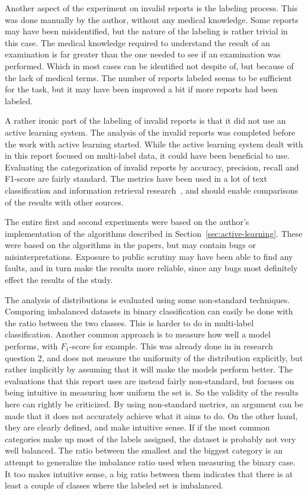 Another aspect of the experiment on invalid reports is the labeling process.
This was done manually by the author, without any medical knowledge.
Some reports may have been misidentified, but the nature of the labeling is rather trivial in this case.
The medical knowledge required to understand the result of an examination is far greater than the one needed to see if an examination was performed.
Which in most cases can be identified not despite of, but because of the lack of medical terms.
The number of reports labeled seems to be sufficient for the task, but it may have been improved a bit if more reports had been labeled.

A rather ironic part of the labeling of invalid reports is that it did not use an active learning system.
The analysis of the invalid reports was completed before the work with active learning started.
While the active learning system dealt with in this report focused on multi-label data, it could have been beneficial to use.
Evaluating the categorization of invalid reports by accuracy, precision, recall and F1-score are fairly standard.
The metrics have been used in a lot of text classification and information retrieval research~\cite{aggarwal2012surveyclass, bishop2006pattern}, and should enable comparisons of the results with other sources.

The entire first and second experiments were based on the author's implementation of the algorithms described in Section~\ref{sec:active-learning}.
These were based on the algorithms in the papers, but may contain bugs or misinterpretations.
Exposure to public scrutiny may have been able to find any faults, and in turn make the results more reliable, since any bugs most definitely effect the results of the study.

The analysis of distributions is evaluated using some non-standard techniques.
Comparing imbalanced datasets in binary classification can easily be done with the ratio between the two classes.
This is harder to do in multi-label classification. 
Another common approach is to measure how well a model performs, with $F_1$-score for example.
This was already done in in research question 2, and does not measure the uniformity of the distribution explicitly, but rather implicitly by assuming that it will make the models perform better.
The evaluations that this report uses are instead fairly non-standard, but focuses on being intuitive in measuring how uniform the set is.
So the validity of the results here can rightly be criticized.
By using non-standard metrics, an argument can be made that it does not accurately achieve what it aims to do.
On the other hand, they are clearly defined, and make intuitive sense.
If if the most common categories make up most of the labels assigned, the dataset is probably not very well balanced.
The ratio between the smallest and the biggest category is an attempt to generalize the imbalance ratio used when measuring the binary case.
It too makes intuitive sense, a big ratio between them indicates that there is at least a couple of classes where the labeled set is imbalanced.

